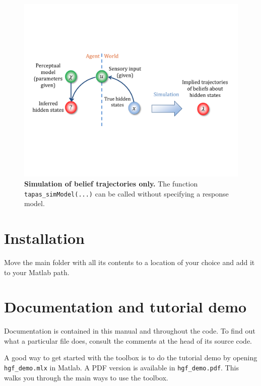\documentclass[11pt,a4paper]{article}
\numberwithin{equation}{section}
\begin{document}
\begin{figure}[h]
\renewcommand{\baselinestretch}{1}
\begin{center}
\includegraphics[width=14cm]{Graphics/Slide4}

\vspace{1ex}
\parbox{14cm}{\caption{\label{Slide4}
\textbf{\upshape Simulation of belief trajectories only.}
The function \texttt{\upshape tapas\_simModel(...)} can be called
without specifying a response model.}}
\end{center}
\end{figure}
 
\section{Installation}
\label{sec:install}

Move the main folder with all its contents to a location of your
choice and add it to your Matlab path.


\section{Documentation and tutorial demo}
\label{sec:doc}

Documentation is contained in this manual and throughout the code. To
find out what a particular file does, consult the comments at the head
of its source code.

A good way to get started with the toolbox is to do the tutorial demo
by opening \texttt{hgf\_demo.mlx} in Matlab. A PDF version is
available in \texttt{hgf\_demo.pdf}. This walks you through the main
ways to use the toolbox.
\end{document}
